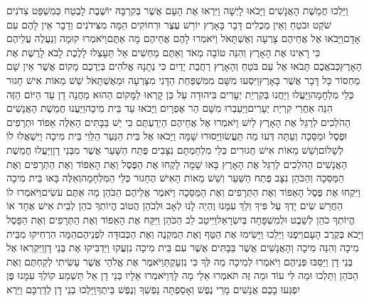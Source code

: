 \documentclass[../main/main.tex]{subfiles}
\begin{document}
\begin{multicols*}{\ncols}
וַיֵּלְכוּ חֲמֵשֶׁת הָאֲנָשִׁים וַיָּבֹאוּ לָיְשָׁה וַיִּרְאוּ אֶת הָעָם אֲשֶׁר בְּקִרְבָּהּ יוֹשֶׁבֶת לָבֶטַח כְּמִשְׁפַּט צִדֹנִים שֹׁקֵט וּבֹטֵחַ וְאֵין מַכְלִים דָּבָר בָּאָרֶץ יוֹרֵשׁ עֶצֶר וּרְחוֹקִים הֵמָּה מִצִּידֹנִים וְדָבָר אֵין לָהֶם עִם אָדָם\PreVerseSpace{}וַיָּבֹאוּ אֶל אֲחֵיהֶם צָרְעָה וְאֶשְׁתָּאֹל וַיֹּאמְרוּ לָהֶם אֲחֵיהֶם מָה אַתֶּם\PreVerseSpace{}וַיֹּאמְרוּ קוּמָה וְנַעֲלֶה עֲלֵיהֶם כִּי רָאִינוּ אֶת הָאָרֶץ וְהִנֵּה טוֹבָה מְאֹד וְאַתֶּם מַחְשִׁים אַל תֵּעָצְלוּ לָלֶכֶת לָבֹא לָרֶשֶׁת אֶת הָאָרֶץ\PreVerseSpace{}כְּבֹאֲכֶם תָּבֹאוּ אֶל עַם בֹּטֵחַ וְהָאָרֶץ רַחֲבַת יָדַיִם כִּי נְתָנָהּ אֱלֹהִים בְּיֶדְכֶם מָקוֹם אֲשֶׁר אֵין שָׁם מַחְסוֹר כָּל דָּבָר אֲשֶׁר בָּאָרֶץ\PreVerseSpace{}וַיִּסְעוּ מִשָּׁם מִמִּשְׁפַּחַת הַדָּנִי מִצָּרְעָה וּמֵאֶשְׁתָּאֹל שֵׁשׁ מֵאוֹת אִישׁ חָגוּר כְּלֵי מִלְחָמָה\PreVerseSpace{}וַיַּעֲלוּ וַיַּחֲנוּ בְּקִרְיַת יְעָרִים בִּיהוּדָה עַל כֵּן קָרְאוּ לַמָּקוֹם הַהוּא מַחֲנֵה דָן עַד הַיּוֹם הַזֶּה הִנֵּה אַחֲרֵי קִרְיַת יְעָרִים\PreVerseSpace{}וַיַּעַבְרוּ מִשָּׁם הַר אֶפְרָיִם וַיָּבֹאוּ עַד בֵּית מִיכָה\PreVerseSpace{}וַיַּעֲנוּ חֲמֵשֶׁת הָאֲנָשִׁים הַהֹלְכִים לְרַגֵּל אֶת הָאָרֶץ לַיִשׁ וַיֹּאמְרוּ אֶל אֲחֵיהֶם הַיְדַעְתֶּם כִּי יֵשׁ בַּבָּתִּים הָאֵלֶּה אֵפוֹד וּתְרָפִים וּפֶסֶל וּמַסֵּכָה וְעַתָּה דְּעוּ מַה תַּעֲשׂוּ\PreVerseSpace{}וַיָּסוּרוּ שָׁמָּה וַיָּבֹאוּ אֶל בֵּית הַנַּעַר הַלֵּוִי בֵּית מִיכָה וַיִּשְׁאֲלוּ לוֹ לְשָׁלוֹם\PreVerseSpace{}וְשֵׁשׁ מֵאוֹת אִישׁ חֲגוּרִים כְּלֵי מִלְחַמְתָּם נִצָּבִים פֶּתַח הַשָּׁעַר אֲשֶׁר מִבְּנֵי דָן\PreVerseSpace{}וַיַּעֲלוּ חֲמֵשֶׁת הָאֲנָשִׁים הַהֹלְכִים לְרַגֵּל אֶת הָאָרֶץ בָּאוּ שָׁמָּה לָקְחוּ אֶת הַפֶּסֶל וְאֶת הָאֵפוֹד וְאֶת הַתְּרָפִים וְאֶת הַמַּסֵּכָה וְהַכֹּהֵן נִצָּב פֶּתַח הַשַּׁעַר וְשֵׁשׁ מֵאוֹת הָאִישׁ הֶחָגוּר כְּלֵי הַמִּלְחָמָה\PreVerseSpace{}וְאֵלֶּה בָּאוּ בֵּית מִיכָה וַיִּקְחוּ אֶת פֶּסֶל הָאֵפוֹד וְאֶת הַתְּרָפִים וְאֶת הַמַּסֵּכָה וַיֹּאמֶר אֲלֵיהֶם הַכֹּהֵן מָה אַתֶּם עֹשִׂים\PreVerseSpace{}וַיֹּאמְרוּ לוֹ הַחֲרֵשׁ שִׂים יָדְךָ עַל פִּיךָ וְלֵךְ עִמָּנוּ וֶהְיֵה לָנוּ לְאָב וּלְכֹהֵן הֲטוֹב הֱיוֹתְךָ כֹהֵן לְבֵית אִישׁ אֶחָד אוֹ הֱיוֹתְךָ כֹהֵן לְשֵׁבֶט וּלְמִשְׁפָּחָה בְּיִשְׂרָאֵל\PreVerseSpace{}וַיִּיטַב לֵב הַכֹּהֵן וַיִּקַּח אֶת הָאֵפוֹד וְאֶת הַתְּרָפִים וְאֶת הַפָּסֶל וַיָּבֹא בְּקֶרֶב הָעָם\PreVerseSpace{}וַיִּפְנוּ וַיֵּלֵכוּ וַיָּשִׂימוּ אֶת הַטַּף וְאֶת הַמִּקְנֶה וְאֶת הַכְּבוּדָּה לִפְנֵיהֶם\PreVerseSpace{}הֵמָּה הִרְחִיקוּ מִבֵּית מִיכָה וְהִנֵּה\OmitEnd{} מִיכָה וְהָאֲנָשִׁים אֲשֶׁר בַּבָּתִּים אֲשֶׁר עִם בֵּית מִיכָה נִזְעֲקוּ וַיַּדְבִּיקוּ אֶת בְּנֵי דָן\PreVerseSpace{}וַיִּקְרְאוּ אֶל בְּנֵי דָן וַיַּסֵּבּוּ פְּנֵיהֶם וַיֹּאמְרוּ לְמִיכָה מַה לְּךָ כִּי נִזְעָקְתָּ\PreVerseSpace{}וַיֹּאמֶר אֶת אֱלֹהַי אֲשֶׁר עָשִׂיתִי לְקַחְתֶּם וְאֶת הַכֹּהֵן וַתֵּלְכוּ וּמַה לִּי עוֹד וּמַה זֶּה תֹּאמְרוּ אֵלַי מַה לָּךְ\PreVerseSpace{}וַיֹּאמְרוּ אֵלָיו בְּנֵי דָן אַל תַּשְׁמַע קוֹלְךָ עִמָּנוּ פֶּן יִפְגְּעוּ בָכֶם אֲנָשִׁים מָרֵי נֶפֶשׁ וְאָסַפְתָּה נַפְשְׁךָ וְנֶפֶשׁ בֵּיתֶךָ\PreVerseSpace{}וַיֵּלְכוּ בְנֵי דָן לְדַרְכָּם וַיַּרְא 
\end{multicols*}
\end{document}
